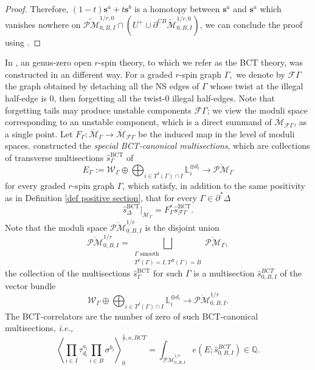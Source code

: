 \documentclass[11pt]{amsart}
\theoremstyle{definition}
\theoremstyle{remark}
\newcommand{\oPMb}{{\overline{\mathcal{PM}}}}
\newcommand{\<}{\left<}
\renewcommand{\>}{\right>}
\numberwithin{equation}{section}
\def\Mbar{{\overline{\mathcal M}}}
\begin{document}
\begin{proof}
        Therefore, $(1-t)\mathbf{s}^a+t\mathbf{s}^b$ is a homotopy between $\mathbf{s}^a$ and $\mathbf{s}^a$ which vanishes nowhere on $\widetilde{\mathcal{PM}}^{1/r,0}_{0,B,I} \cap (U^+\cup \partial^{CB}\widetilde{\mathcal{M}}^{1/r,0}_{0,B,I})$, we can conclude the proof using \cite[Lemma 4.12]{BCT2}.
 
        
    \end{proof}

    In \cite{BCT1,BCT2}, an genus-zero open $r$-spin theory, to which we refer as the BCT theory, was constructed in an different way. For a graded $r$-spin graph $\Gamma,$ we denote by $\mathcal {F}\Gamma$ the graph obtained by detaching all the NS edges of $\Gamma$ whose twist at the illegal half-edge is $0$, then forgetting all the twist-$0$ illegal half-edges. Note that forgetting tails may produce unstable components $\mathcal {F} \Gamma$; we view the moduli space corresponding to an unstable component, which is a direct summand of $\Mbar_{\mathcal F \Gamma}$, as a single point.  Let $F_\Gamma\colon \Mbar_\Gamma \to \Mbar_{\mathcal F\Gamma}$ be the induced map in the level of moduli spaces.
     \cite[Proposition 6.2]{BCT2} constructed the \emph{special BCT-canonical multisections}, which are collections of transverse multisections $\hat s^{\text{BCT}}_\Gamma$ of 
     $$E_{\Gamma}:=\mathcal W_{\Gamma}\oplus \bigoplus_{i\in T^I(\Gamma)\cap I} \mathbb L_i^{\oplus d_i} \to \oPMb_\Gamma$$
     for every graded $r$-spin graph $\Gamma$, which satisfy, in addition to the same positivity as in Definition \ref{def positive section}, that for every $\Gamma\in \partial^* \Delta$ 
        \begin{equation}\label{eq bct special canonical}
         \hat s^{\text{BCT}}_\Delta\big\vert_{ \Mbar_{\Gamma_{}}}=F_\Gamma^* \hat s^{\text{BCT}}_{\mathcal F \Gamma}.
        \end{equation}
        Note that the moduli space $\oPMb^{1/r}_{0,B,I}$ is the disjoint union
        $$
        \oPMb^{1/r}_{0,B,I}=\bigsqcup_{\substack{\Gamma \text{ smooth}\\ T^I(\Gamma)=I,T^B(\Gamma)=B}} \oPMb_{\Gamma},
        $$
        the collection of the multisections $\hat s^{\text{BCT}}_\Gamma$ for such $\Gamma$ is a multisection $\hat {s}_{0,B,I}^{BCT}$ of the vector bundle 
        $$
        \mathcal W_{\Gamma}\oplus \bigoplus_{i\in T^I(\Gamma)\cap I} \mathbb L_i^{\oplus d_i} \to \oPMb^{1/r}_{0,B,I}.
        $$
        The BCT-correlators are the number of zero of such BCT-canonical multisections, \textit{i.e.,}
     \[
    \left\langle \prod_{i\in I}\tau^{a_i}_{d_i}\prod_{i \in B}\sigma^{b_i}\right\rangle^{\frac{1}{r},o,BCT}_0 = \int_{\oPMb^{1/r}_{0,B,I}}e(E ; \hat {s}_{0,B,I}^{BCT})\in\mathbb{Q}. 
    \]
    
\end{document}
